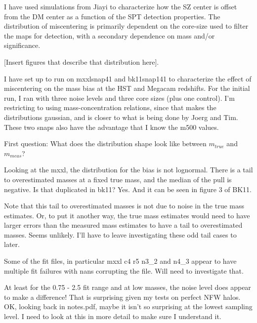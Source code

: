 \documentclass[11pt]{article}
\begin{document}
I have used simulations from Jiayi to characterize how the SZ center is offset from the DM center as a function of the SPT detection properties. The distribution of miscentering is primarily dependent on the core-size used to filter the maps for detection, with a secondary dependence on mass and/or significance.

[Insert figures that describe that distribution here].

I have set up to run on mxxlsnap41 and bk11snap141 to characterize the effect of miscentering on the mass bias at the HST and Megacam redshifts. For the initial run, I ran with three noise levels and three core sizes (plus one control). I'm restricting to using mass-concentration relations, since that makes the distributions gaussian, and is closer to what is being done by Joerg and Tim. These two snaps also have the advantage that I know the m500 values.


First question: What does the distribution shape look like between $m_{true}$ and $m_{meas}$?

Looking at the mxxl, the distribution for the bias is not lognormal. There is a tail to overestimated masses at a fixed true mass, and the median of the pull is negative.  Is that duplicated in bk11? Yes. And it can be seen in figure 3 of BK11.

Note that this tail to overestimated masses is not due to noise in the true mass estimates. Or, to put it another way, the true mass estimates would need to have larger errors than the measured mass estimates to have a tail to overestimated masses. Seems unlikely. I'll have to leave investigating these odd tail cases to later.

Some of the fit files, in particular mxxl c4 r5 n3\_2 and n4\_3 appear to have multiple fit failures with nans corrupting the file. Will need to investigate that.

At least for the 0.75 - 2.5 fit range and at low masses, the noise level does appear to make a difference! That is surprising given my tests on perfect NFW halos.  OK, looking back in notes.pdf, maybe it isn't so surprising at the lowest sampling level. I need to look at this in more detail to make sure I understand it.



\clearpage \newpage
\end{document}
